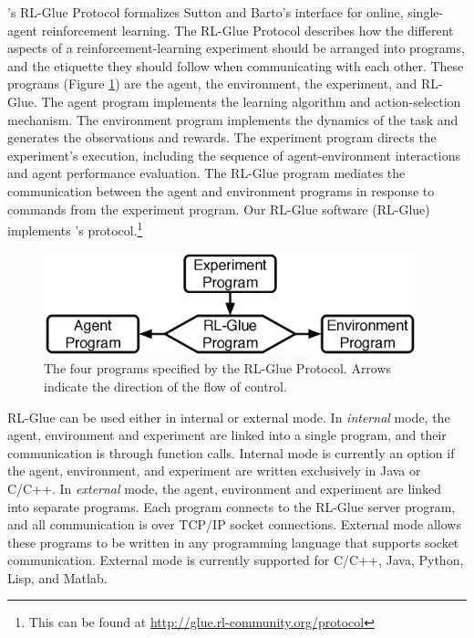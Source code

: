 \documentclass[twoside,11pt]{article}
\begin{document}
\citeauthor{whiteThesis}'s RL-Glue Protocol \citeyearpar{whiteThesis} formalizes Sutton and Barto's interface for online, single-agent reinforcement learning.  The RL-Glue Protocol describes how the different aspects of a reinforcement-learning experiment should be arranged into programs, and the etiquette they should follow when communicating with each other. These programs (Figure \ref{fig:RLDIA}) are the agent, the environment, the experiment, and RL-Glue.  The agent program implements the learning algorithm and action-selection mechanism. The environment program implements the dynamics of the task and generates the observations and rewards. The experiment program directs the experiment's execution, including the sequence of agent-environment interactions and agent performance evaluation.  The RL-Glue program mediates the communication between the agent and environment programs in response to commands from the experiment program. Our RL-Glue software (RL-Glue) implements \citeauthor{whiteThesis}'s protocol.\footnote{This can be found at \url{http://glue.rl-community.org/protocol}} 

\vspace{-0.3cm}
\begin{figure}[ht]
\begin{center}
\includegraphics[height=3cm]{figures/glue.eps}
\vspace{-0.4cm}
\caption{\small The four programs specified by the RL-Glue Protocol.  Arrows indicate the direction of the flow of control.}
\label{fig:RLDIA}
\end{center}
\end{figure}

 RL-Glue can be used either in  internal or external mode.  In \textit{internal} mode, the agent, environment and experiment are linked into a single program, and their communication is through function calls.  Internal mode is currently an option if the agent, environment, and experiment are written exclusively in Java or C/C++.  In  \textit{external} mode, the agent, environment and experiment are linked into separate programs.  Each program connects to the RL-Glue server program, and all communication is over TCP/IP socket connections. External mode allows these programs to be written in any programming language that supports socket communication.  External mode is currently supported for C/C++, Java, Python, Lisp, and Matlab.
\end{document}
